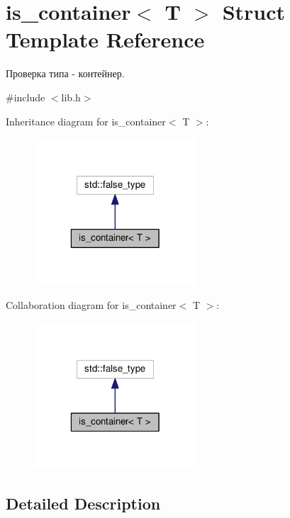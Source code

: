 \hypertarget{structis__container}{\section{is\-\_\-container$<$ T $>$ Struct Template Reference}
\label{structis__container}
}


Проверка типа -\/ контейнер.  




{\ttfamily \#include $<$lib.\-h$>$}



Inheritance diagram for is\-\_\-container$<$ T $>$\-:
\nopagebreak
\begin{figure}[H]
\begin{center}
\leavevmode
\includegraphics[width=172pt]{structis__container__inherit__graph}
\end{center}
\end{figure}


Collaboration diagram for is\-\_\-container$<$ T $>$\-:
\nopagebreak
\begin{figure}[H]
\begin{center}
\leavevmode
\includegraphics[width=172pt]{structis__container__coll__graph}
\end{center}
\end{figure}


\subsection{Detailed Description}
